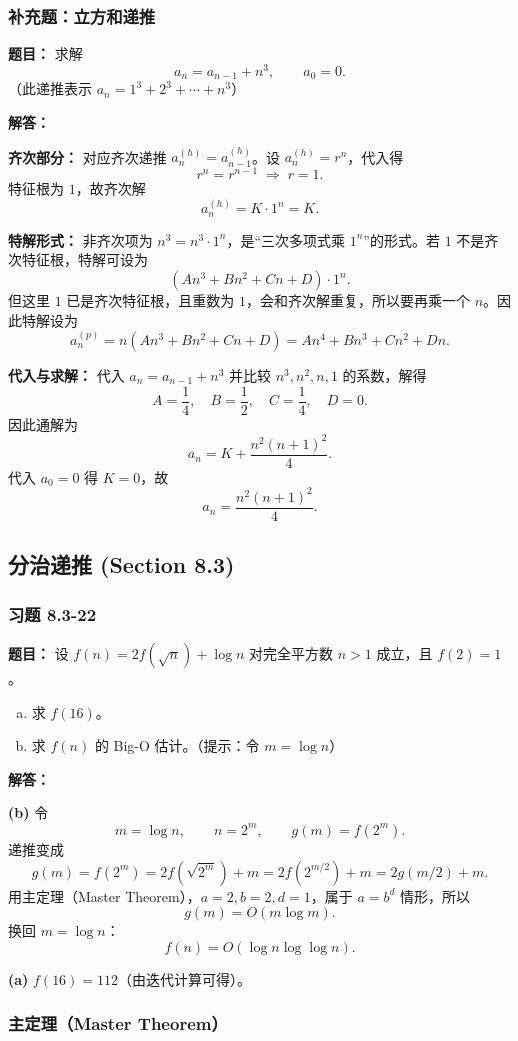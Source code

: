 \documentclass[11pt,UTF8]{article}
\begin{document}
\subsubsection*{补充题：立方和递推}
\textbf{题目：} 求解
\[ a_n=a_{n-1}+n^3,\qquad a_0=0. \]
（此递推表示 $a_n=1^3+2^3+\cdots+n^3$）

\textbf{解答：}

\textbf{齐次部分：} 对应齐次递推 $a_n^{(h)}=a_{n-1}^{(h)}$。设 $a_n^{(h)}=r^n$，代入得
\[ r^n=r^{n-1}\;\Rightarrow\;r=1. \]
特征根为 $1$，故齐次解
\[ a_n^{(h)}=K\cdot 1^n=K. \]

\textbf{特解形式：} 非齐次项为 $n^3=n^3\cdot 1^n$，是``三次多项式乘 $1^n$''的形式。若 $1$ 不是齐次特征根，特解可设为
\[ (An^3+Bn^2+Cn+D)\cdot 1^n. \]
但这里 $1$ 已是齐次特征根，且重数为 $1$，会和齐次解重复，所以要再乘一个 $n$。因此特解设为
\[ a_n^{(p)}=n(An^3+Bn^2+Cn+D)=An^4+Bn^3+Cn^2+Dn. \]

\textbf{代入与求解：} 代入 $a_n=a_{n-1}+n^3$ 并比较 $n^3,n^2,n,1$ 的系数，解得
\[ A=\frac{1}{4},\quad B=\frac{1}{2},\quad C=\frac{1}{4},\quad D=0. \]
因此通解为
\[ a_n=K+\frac{n^2(n+1)^2}{4}. \]
代入 $a_0=0$ 得 $K=0$，故
\[ \boxed{a_n=\frac{n^2(n+1)^2}{4}.} \]



\newpage
\subsection{分治递推 (Section 8.3)}

\subsubsection*{习题 8.3-22}
\textbf{题目：} 设 $f(n)=2f(\sqrt{n})+\log n$ 对完全平方数 $n>1$ 成立，且 $f(2)=1$。
\begin{enumerate}[a)]
    \item 求 $f(16)$。
    \item 求 $f(n)$ 的 Big-O 估计。（提示：令 $m=\log n$）
\end{enumerate}

\textbf{解答：}

\textbf{(b)} 令
\[ m=\log n,\qquad n=2^m,\qquad g(m)=f(2^m). \]
递推变成
\[ g(m)=f(2^m)=2f(\sqrt{2^m})+m=2f(2^{m/2})+m=2g(m/2)+m. \]
用主定理（Master Theorem），$a=2,b=2,d=1$，属于 $a=b^d$ 情形，所以
\[ g(m)=O(m\log m). \]
换回 $m=\log n$：
\[ \boxed{f(n)=O(\log n\log\log n).} \]

\textbf{(a)} $f(16)=112$（由迭代计算可得）。

\subsubsection*{主定理（Master Theorem）}
\end{document}
